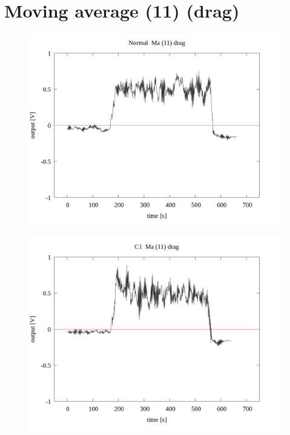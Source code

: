 \documentclass[a4paper]{jsarticle}
\author{}
\title{}
\date{}
\begin{document}
\section{Moving average (11) (drag)}

\begin{figure}[htbp]
    \footnotesize
    \begin{center}
        \includegraphics[width=140mm]{../../../33_result/210806/moving_average/11/drag/Normal_ma(11)_drag.png}
    \end{center}
\end{figure}

\begin{figure}[htbp]
    \footnotesize
    \begin{center}
        \includegraphics[width=140mm]{../../../33_result/210806/moving_average/11/drag/C1_ma(11)_drag.png}
    \end{center}
\end{figure}
\end{document}
